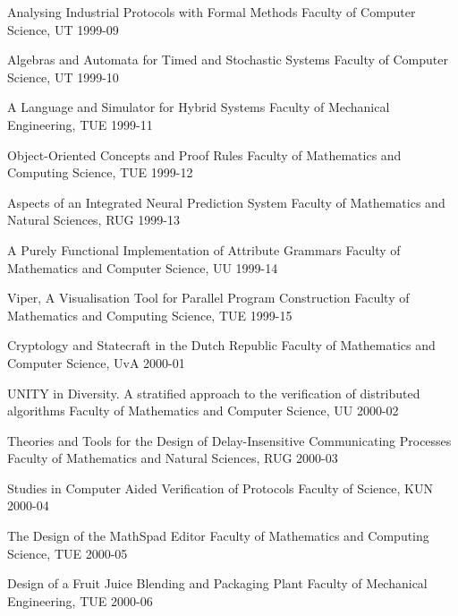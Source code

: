 \begin{multicols}{2}
         {Analysing Industrial Protocols with Formal Methods}
         {Faculty of Computer Science, UT}
         {1999-09}

         {Algebras and Automata for Timed and Stochastic Systems}
         {Faculty of Computer Science, UT}
         {1999-10}

         {A Language and Simulator for Hybrid Systems}
         {Faculty of Mechanical Engineering, TUE}
         {1999-11}

         {Object-Oriented Concepts and Proof Rules}
         {Faculty of Mathematics and Computing Science, TUE}
         {1999-12}

         {Aspects of an Integrated Neural Prediction System}
         {Faculty of Mathematics and Natural Sciences, RUG}
         {1999-13}

         {A Purely Functional Implementation of Attribute Grammars}
         {Faculty of Mathematics and Computer Science, UU}
         {1999-14}

         {Viper, A Visualisation Tool for Parallel Program
Construction}
         {Faculty of Mathematics and Computing Science, TUE}
         {1999-15}

         {Cryptology and Statecraft in the Dutch Republic}
         {Faculty of Mathematics and Computer Science, UvA}
         {2000-01}

         {UNITY in Diversity. A stratified approach to the
         verification of distributed algorithms}
         {Faculty of Mathematics and Computer Science, UU}
         {2000-02}

         {Theories and Tools for the Design of Delay-Insensitive
         Communicating Processes}
         {Faculty of Mathematics and Natural Sciences, RUG}
         {2000-03}

         {Studies in Computer Aided Verification of Protocols}
         {Faculty of Science, KUN}
         {2000-04}

         {The Design of the MathSpad Editor}
         {Faculty of Mathematics and Computing Science, TUE}
         {2000-05}

         {Design of a Fruit Juice Blending and Packaging Plant}
         {Faculty of Mechanical Engineering, TUE}
         {2000-06}


\end{multicols}

